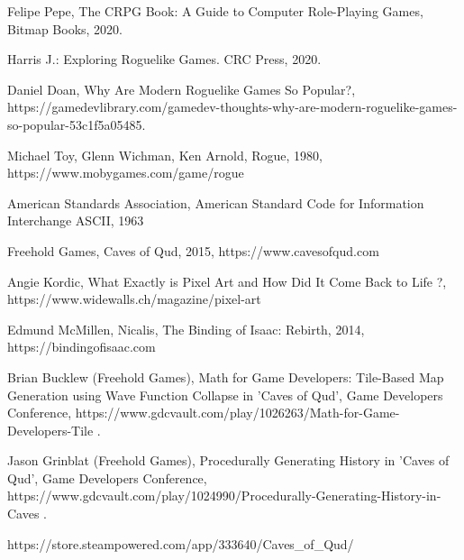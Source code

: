 \documentclass[12pt,twoside]{article}
\begin{document}
\begin{thebibliography}{4}
	

 Felipe Pepe, The CRPG Book: A Guide to Computer Role-Playing Games, Bitmap Books, 2020.

 Harris J.: Exploring Roguelike Games. CRC Press, 2020.

 Daniel Doan, Why Are Modern Roguelike Games So Popular?, https://gamedevlibrary.com/gamedev-thoughts-why-are-modern-roguelike-games-so-popular-53c1f5a05485.

 Michael Toy, Glenn Wichman, Ken Arnold, Rogue, 1980, https://www.mobygames.com/game/rogue

 American Standards Association, American Standard Code for Information Interchange ASCII, 1963

 Freehold Games, Caves of Qud, 2015, https://www.cavesofqud.com

 Angie Kordic, What Exactly is Pixel Art and How Did It Come Back to Life ?, https://www.widewalls.ch/magazine/pixel-art

 Edmund McMillen, Nicalis, The Binding of Isaac: Rebirth, 2014, https://bindingofisaac.com

 Brian Bucklew (Freehold Games), Math for Game Developers: Tile-Based Map Generation using Wave Function Collapse in 'Caves of Qud', Game Developers Conference, https://www.gdcvault.com/play/1026263/Math-for-Game-Developers-Tile .

 Jason Grinblat (Freehold Games), Procedurally Generating History in 'Caves of Qud', Game Developers Conference, https://www.gdcvault.com/play/1024990/Procedurally-Generating-History-in-Caves .

 https://store.steampowered.com/app/333640/Caves\_of\_Qud/



\end{thebibliography}
\end{document}
